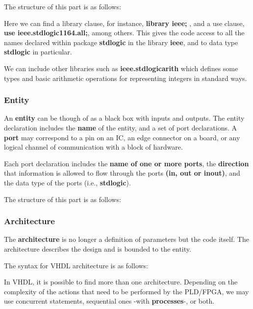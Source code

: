 The structure of this part is as follows:



Here we can find a library clause, for instance, \textbf{library ieee;} , and a use clause, \textbf{use ieee.std\textunderscore logic\textunderscore 1164.all;}, among others. This gives the code access to all the names declared within package \textbf{std\textunderscore logic} in the library \textbf{ieee}, and to data type \textbf{std\textunderscore logic} in particular.\medskip

We can include other libraries such as \textbf{ieee.std\textunderscore logic\textunderscore arith} which defines some types and basic arithmetic operations for representing integers in standard ways.

\clearpage

\subsubsection{Entity}

An \textbf{entity} can be though of as a black box with inputs and outputs. The entity declaration includes the \textbf{name} of the entity, and a set of port declarations. A \textbf{port} may correspond to a pin on an IC, an edge connector on a board, or any logical channel of communication with a block of hardware.\medskip

Each port declaration includes the \textbf{name of one or more ports}, the \textbf{direction} that information is allowed to flow through the ports \textbf{(in, out or inout)}, and the data type of the ports (i.e., \textbf{std\textunderscore logic}). \medskip

The structure of this part is as follows:



\subsubsection{Architecture}

The \textbf{architecture} is no longer a definition of parameters but the code itself. The architecture describes the design and is bounded to the entity. 

The syntax for VHDL architecture is as follows: 


In VHDL, it is possible to find more than one architecture. Depending on the complexity of the actions that need to be performed by the PLD/FPGA, we may use concurrent statements, sequential ones -with \textbf{processes}-, or both.\medskip

